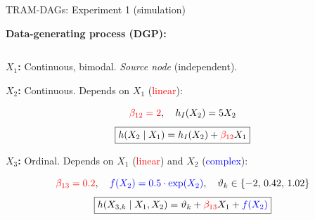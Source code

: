 \documentclass[onlytextwidth,english]{beamer}\usepackage[]{graphicx}\usepackage[]{xcolor}
\begin{document}
\begin{frame}{TRAM-DAGs: Experiment 1 (simulation)}

\textbf{Data-generating process (DGP):}

\vspace{-1cm}

\begin{columns}

\begin{column}{0.72\textwidth}

\textbf{\(X_1\):} Continuous, bimodal. \textit{Source node} (independent).

\vspace{0.4cm}

\textbf{\(X_2\):} Continuous. Depends on \(X_1\) (\textcolor{red}{linear}):

\vspace{0.15cm}
{\scriptsize
\[
\textcolor{red}{\beta_{12} = 2}, \quad h_I(X_2) = 5 X_2
\]
\[
\boxed{
h(X_2 \mid X_1) = h_I(X_2) + \textcolor{red}{\beta_{12}} X_1
}
\]
}

\vspace{0.4cm}

\textbf{\(X_3\):} Ordinal. Depends on \(X_1\) (\textcolor{red}{linear}) and \(X_2\) (\textcolor{blue}{complex}):

\vspace{0.15cm}
{\scriptsize
\[
\textcolor{red}{\beta_{13} = 0.2}, \quad \textcolor{blue}{f(X_2) = 0.5 \cdot \exp(X_2)}, \quad \vartheta_k \in \{-2,\, 0.42,\, 1.02\}
\]
\[
\boxed{
h(X_{3,k} \mid X_1, X_2) = \vartheta_k + \textcolor{red}{\beta_{13}} X_1 + \textcolor{blue}{f(X_2)}
}
\]
}


\end{column}


\end{columns}
\end{frame}
\end{document}
